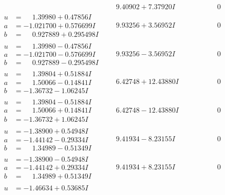 \documentclass[1p]{elsarticle_modified}
\theoremstyle{definition}
\begin{document}
$$\begin{array}{c|c|c}
 & \phantom{-}9.40902 + 7.37920 I & \phantom{-0.000000 } 0 \\ \hline\begin{aligned}
u &= \phantom{-}1.39980 + 0.47856 I \\
a &= -1.021700 + 0.576699 I \\
b &= \phantom{-}0.927889 + 0.295498 I\end{aligned}
 & \phantom{-}9.93256 + 3.56952 I & \phantom{-0.000000 } 0 \\ \hline\begin{aligned}
u &= \phantom{-}1.39980 - 0.47856 I \\
a &= -1.021700 - 0.576699 I \\
b &= \phantom{-}0.927889 - 0.295498 I\end{aligned}
 & \phantom{-}9.93256 - 3.56952 I & \phantom{-0.000000 } 0 \\ \hline\begin{aligned}
u &= \phantom{-}1.39804 + 0.51884 I \\
a &= \phantom{-}1.50066 - 0.14841 I \\
b &= -1.36732 - 1.06245 I\end{aligned}
 & \phantom{-}6.42748 + 12.43880 I & \phantom{-0.000000 } 0 \\ \hline\begin{aligned}
u &= \phantom{-}1.39804 - 0.51884 I \\
a &= \phantom{-}1.50066 + 0.14841 I \\
b &= -1.36732 + 1.06245 I\end{aligned}
 & \phantom{-}6.42748 - 12.43880 I & \phantom{-0.000000 } 0 \\ \hline\begin{aligned}
u &= -1.38900 + 0.54948 I \\
a &= -1.44142 - 0.29334 I \\
b &= \phantom{-}1.34989 - 0.51349 I\end{aligned}
 & \phantom{-}9.41934 - 8.23155 I & \phantom{-0.000000 } 0 \\ \hline\begin{aligned}
u &= -1.38900 - 0.54948 I \\
a &= -1.44142 + 0.29334 I \\
b &= \phantom{-}1.34989 + 0.51349 I\end{aligned}
 & \phantom{-}9.41934 + 8.23155 I & \phantom{-0.000000 } 0 \\ \hline\begin{aligned}
u &= -1.46634 + 0.53685 I \\

\end{aligned}
\end{array}$$
\end{document}
